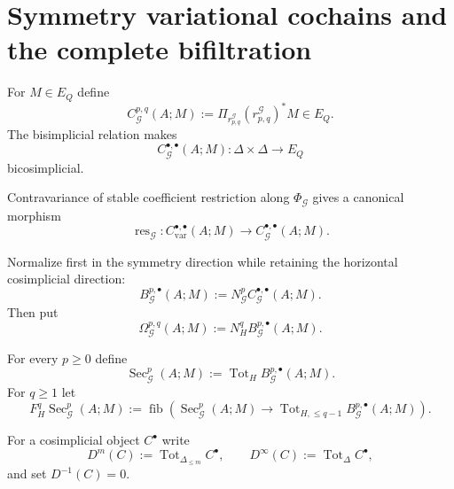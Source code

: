 \section{Symmetry variational cochains and the complete bifiltration}
\label{sec:symmetry-noether-symmetry-variational-cochains-and-the-complete-bifiltration}

\begin{definition}
\label{def:symmetry-noether-symmetry-variational-cochains}
For $M\in E_Q$ define
\[
C_{\mathcal G}^{p,q}(A;M)
:=
\Pi_{r^{\mathcal G}_{p,q}}
(r^{\mathcal G}_{p,q})^*M
\in E_Q.
\]
The bisimplicial relation makes
\[
C_{\mathcal G}^{\bullet,\bullet}(A;M)
:
\Delta\times\Delta\longrightarrow E_Q
\]
bicosimplicial.
\end{definition}

Contravariance of stable coefficient restriction along
$\Phi_{\mathcal G}$ gives a canonical morphism
\[
\operatorname{res}_{\mathcal G}:
C_{\mathrm{var}}^{\bullet,\bullet}(A;M)
\longrightarrow
C_{\mathcal G}^{\bullet,\bullet}(A;M).
\]

\begin{definition}
\label{def:symmetry-noether-symmetry-and-horizontal-normalization}
Normalize first in the symmetry direction while retaining the horizontal cosimplicial
direction:
\[
B_{\mathcal G}^{p,\bullet}(A;M)
:=
N_{\mathcal G}^p
C_{\mathcal G}^{\bullet,\bullet}(A;M).
\]
Then put
\[
\Omega_{\mathcal G}^{p,q}(A;M)
:=
N_H^q
B_{\mathcal G}^{p,\bullet}(A;M).
\]
\end{definition}

\begin{definition}
\label{def:symmetry-noether-symmetry-secondary-coefficients}
For every $p\ge0$ define
\[
\operatorname{Sec}_{\mathcal G}^{p}(A;M)
:=
\operatorname{Tot}_H
B_{\mathcal G}^{p,\bullet}(A;M).
\]
For $q\ge1$ let
\[
F_H^q
\operatorname{Sec}_{\mathcal G}^{p}(A;M)
:=
\operatorname{fib}
\left(
\operatorname{Sec}_{\mathcal G}^{p}(A;M)
\longrightarrow
\operatorname{Tot}_{H,\le q-1}
B_{\mathcal G}^{p,\bullet}(A;M)
\right).
\]
\end{definition}

For a cosimplicial object $C^\bullet$ write
\[
D^m(C):=\operatorname{Tot}_{\Delta_{\le m}}C^\bullet,
\qquad
D^\infty(C):=\operatorname{Tot}_{\Delta}C^\bullet,
\]
and set $D^{-1}(C)=0$.

